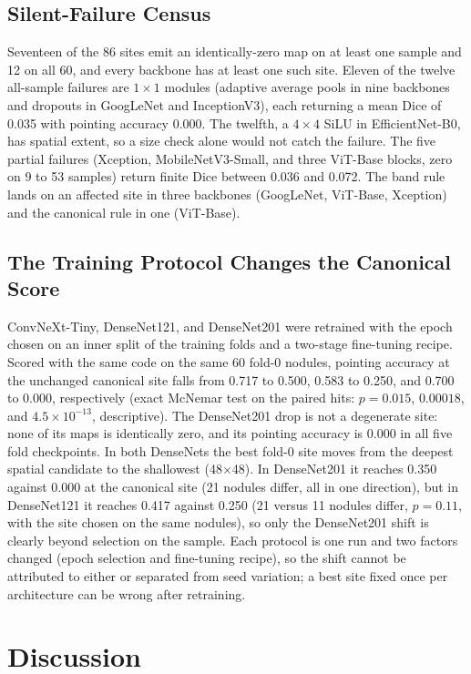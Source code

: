 \documentclass[conference]{IEEEtran}
\begin{document}
\subsection{Silent-Failure Census}\label{sec:census}
Seventeen of the 86 sites emit an identically-zero map on at least one sample and 12 on all 60, and every backbone has at least one such site. Eleven of the twelve all-sample failures are $1\times1$ modules (adaptive average pools in nine backbones and dropouts in GoogLeNet and InceptionV3), each returning a mean Dice of 0.035 with pointing accuracy 0.000. The twelfth, a $4\times4$ SiLU in EfficientNet-B0, has spatial extent, so a size check alone would not catch the failure. The five partial failures (Xception, MobileNetV3-Small, and three ViT-Base blocks, zero on 9 to 53 samples) return finite Dice between 0.036 and 0.072. The band rule lands on an affected site in three backbones (GoogLeNet, ViT-Base, Xception) and the canonical rule in one (ViT-Base).

\subsection{The Training Protocol Changes the Canonical Score}\label{sec:protocol}
ConvNeXt-Tiny, DenseNet121, and DenseNet201 were retrained with the epoch chosen on an inner split of the training folds and a two-stage fine-tuning recipe. Scored with the same code on the same 60 fold-0 nodules, pointing accuracy at the unchanged canonical site falls from 0.717 to 0.500, 0.583 to 0.250, and 0.700 to 0.000, respectively (exact McNemar test on the paired hits: $p=0.015$, $0.00018$, and $4.5\times10^{-13}$, descriptive). The DenseNet201 drop is not a degenerate site: none of its maps is identically zero, and its pointing accuracy is 0.000 in all five fold checkpoints. In both DenseNets the best fold-0 site moves from the deepest spatial candidate to the shallowest (48$\times$48). In DenseNet201 it reaches 0.350 against 0.000 at the canonical site (21 nodules differ, all in one direction), but in DenseNet121 it reaches 0.417 against 0.250 (21 versus 11 nodules differ, $p=0.11$, with the site chosen on the same nodules), so only the DenseNet201 shift is clearly beyond selection on the sample. Each protocol is one run and two factors changed (epoch selection and fine-tuning recipe), so the shift cannot be attributed to either or separated from seed variation; a best site fixed once per architecture can be wrong after retraining.

\section{Discussion}\label{sec:discussion}
\end{document}

